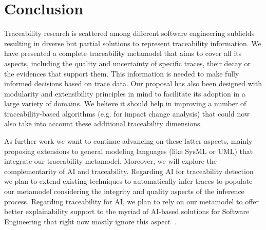 \section{Conclusion}\label{sec:conclusion}
Traceability research is scattered among different software engineering subfields resulting in diverse but partial solutions to represent traceability information. We have presented a complete traceability metamodel that aims to cover all its aspects, including the quality and uncertainty of specific traces, their decay or the evidences that support them. This information is needed to make fully informed decisions based on trace data. Our proposal has also been designed with modularity and extensibility principles in mind to facilitate its adoption in a large variety of domains. We believe it should help in improving a number of traceability-based algorithms (e.g. for impact change analysis) that could now also take into account these additional traceability dimensions.

As further work we want to continue advancing on these latter aspects, mainly proposing extensions to general modeling languages (like SysML or UML) that integrate our traceability metamodel. Moreover, we will explore the complementarity of AI and traceability. Regarding AI for traceability detection we plan to extend existing techniques to automatically infer traces to populate our metamodel considering the integrity and quality aspects of the inference process. Regarding traceability for AI, we plan to rely on our metamodel to offer better explainability support to the myriad of AI-based solutions for Software Engineering that right now mostly ignore this aspect~\cite{carleton2020-intersection-AI-and-SE,ozkaya2020-differences-in-AI-enabled-engineering}.
